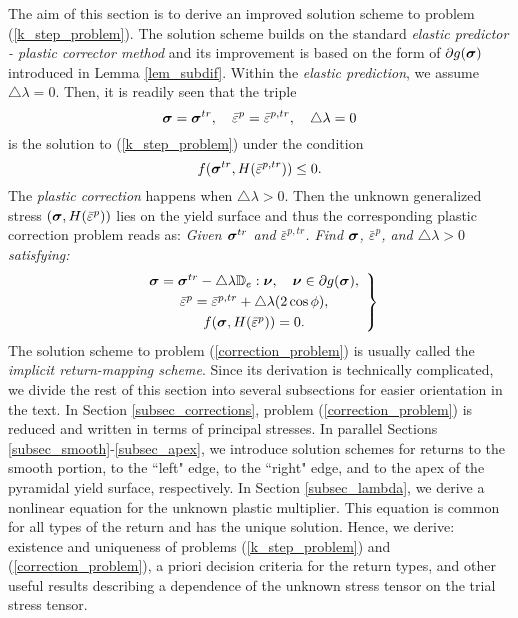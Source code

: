 \documentclass[a4paper,12pt]{article}
\theoremstyle{remark}
\newcommand{\mbf}[1]{\mbox{\boldmath$#1$}}
\numberwithin{equation}{section}
\begin{document}
The aim of this section is to derive an improved solution scheme to problem (\ref{k_step_problem}).  The solution scheme builds on the standard {\it elastic predictor - plastic corrector method} and its improvement is based on the form of $\partial g(\mbf\sigma)$ introduced in Lemma \ref{lem_subdif}. Within the {\it elastic prediction}, we assume $\triangle\lambda=0$. Then, it is readily seen that the triple
\begin{equation}
\mbf{\sigma}=\mbf{\sigma}^{tr},\quad \bar{\varepsilon}^p=\bar{\varepsilon}^{p,tr}, \quad \triangle\lambda=0
\label{elast_solution}
\end{equation}
is the solution to (\ref{k_step_problem}) under the condition
\begin{equation}
f(\mbf{\sigma}^{tr},H(\bar{\varepsilon}^{p,tr}))\leq0.
\label{trial_admissibility}
\end{equation}
The {\it plastic correction} happens when $\triangle\lambda>0$. Then the unknown generalized stress $(\mbf\sigma,H(\bar{\varepsilon}^p))$ lies on the yield surface and thus the corresponding plastic correction problem reads as:
{\it Given $\mbf{\sigma}^{tr}$ and $\bar{\varepsilon}^{p,tr}$. Find $\mbf{\sigma}$,  $\bar{\varepsilon}^p$, and $\triangle\lambda>0$ satisfying:}
\begin{equation}
\left.
\begin{array}{c}
\mbf{\sigma}=\mbf{\sigma}^{tr}-\triangle\lambda\mathbb D_e:\mbf\nu,\quad \mbf\nu\in\partial g(\mbf\sigma),\\[1mm]
\bar{\varepsilon}^p=\bar{\varepsilon}^{p,tr}+\triangle\lambda (2\cos\phi),\\[1mm]
f(\mbf{\sigma},H(\bar\varepsilon^p))=0.
\end{array}
\right\}
\label{correction_problem}
\end{equation}
The solution scheme to problem (\ref{correction_problem}) is usually called the {\it implicit return-mapping scheme}. Since its derivation is technically complicated, we divide the rest of this section into several subsections for easier orientation in the text. In Section \ref{subsec_corrections}, problem (\ref{correction_problem}) is reduced and written in terms of principal stresses. In parallel Sections \ref{subsec_smooth}-\ref{subsec_apex}, we introduce solution schemes for returns to the smooth portion, to the ``left" edge, to the ``right" edge, and to the apex of the pyramidal yield surface, respectively.  In Section \ref{subsec_lambda}, we derive a nonlinear equation for the unknown plastic multiplier. This equation is common for all types of the return and has the unique solution. Hence, we derive: existence and uniqueness of problems (\ref{k_step_problem}) and (\ref{correction_problem}), a priori decision criteria for the return types, and other useful results describing a dependence of the unknown stress tensor on the trial stress tensor.
 
\end{document}
